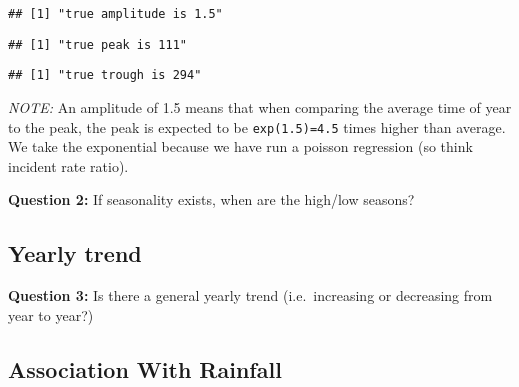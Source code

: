 \documentclass[]{book}
\newenvironment{Shaded}{\begin{snugshade}}{\end{snugshade}}
\newcommand{\KeywordTok}[1]{\textcolor[rgb]{0.13,0.29,0.53}{\textbf{#1}}}
\newcommand{\DecValTok}[1]{\textcolor[rgb]{0.00,0.00,0.81}{#1}}
\newcommand{\StringTok}[1]{\textcolor[rgb]{0.31,0.60,0.02}{#1}}
\newcommand{\OperatorTok}[1]{\textcolor[rgb]{0.81,0.36,0.00}{\textbf{#1}}}
\newcommand{\NormalTok}[1]{#1}
\begin{document}
\begin{verbatim}
## [1] "true amplitude is 1.5"
\end{verbatim}

\begin{Shaded}
\end{Shaded}

\begin{verbatim}
## [1] "true peak is 111"
\end{verbatim}

\begin{Shaded}
\end{Shaded}

\begin{verbatim}
## [1] "true trough is 294"
\end{verbatim}

\emph{NOTE:} An amplitude of 1.5 means that when comparing the average
time of year to the peak, the peak is expected to be
\texttt{exp(1.5)=4.5} times higher than average. We take the exponential
because we have run a poisson regression (so think incident rate ratio).

\textbf{Question 2:} If seasonality exists, when are the high/low
seasons?

\subsection{Yearly trend}\label{yearly-trend-1}

\textbf{Question 3:} Is there a general yearly trend (i.e.~increasing or
decreasing from year to year?)

\subsection{Association With
Rainfall}\label{association-with-rainfall-1}
\end{document}
